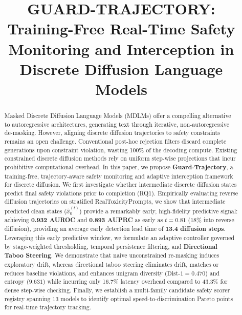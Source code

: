 \documentclass[conference]{IEEEtran}
\begin{document}
\title{GUARD-TRAJECTORY: Training-Free Real-Time Safety Monitoring and Interception in Discrete Diffusion Language Models}

\author{
\and
{}
}

\maketitle

\begin{abstract}
Masked Discrete Diffusion Language Models (MDLMs) offer a compelling alternative to autoregressive architectures, generating text through iterative, non-autoregressive de-masking. However, aligning discrete diffusion trajectories to safety constraints remains an open challenge. Conventional post-hoc rejection filters discard complete generations upon constraint violation, wasting 100\% of the decoding compute. Existing constrained discrete diffusion methods rely on uniform step-wise projections that incur prohibitive computational overhead. In this paper, we propose \textbf{Guard-Trajectory}, a training-free, trajectory-aware safety monitoring and adaptive interception framework for discrete diffusion. We first investigate whether intermediate discrete diffusion states predict final safety violations prior to completion (RQ1). Empirically evaluating reverse diffusion trajectories on stratified RealToxicityPrompts, we show that intermediate predicted clean states ($\hat{x}_0^{(t)}$) provide a remarkably early, high-fidelity predictive signal: achieving \textbf{0.932 AUROC} and \textbf{0.893 AUPRC} as early as $t=0.81$ (18\% into reverse diffusion), providing an average early detection lead time of \textbf{13.4 diffusion steps}. Leveraging this early predictive window, we formulate an adaptive controller governed by stage-weighted thresholding, temporal persistence filtering, and \textbf{Directional Taboo Steering}. We demonstrate that naive unconstrained re-masking induces exploratory drift, whereas directional taboo steering eliminates drift, matches or reduces baseline violations, and enhances unigram diversity ($\text{Dist-1}=0.470$) and entropy ($9.631$) while incurring only 16.7\% latency overhead compared to 43.3\% for dense step-wise checking. Finally, we establish a multi-family candidate safety scorer registry spanning 13 models to identify optimal speed-to-discrimination Pareto points for real-time trajectory tracking.
\end{abstract}
\end{document}
